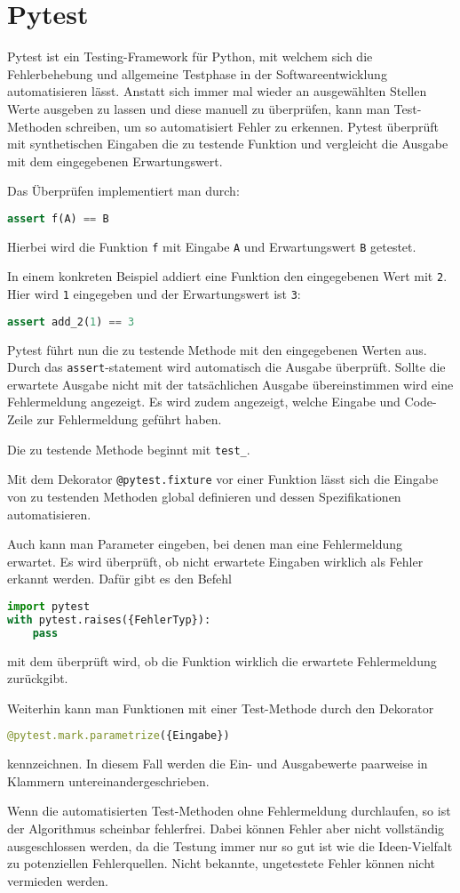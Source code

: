 \section{Pytest}
Pytest ist ein Testing-Framework für Python, mit welchem sich die Fehlerbehebung und allgemeine Testphase in der Softwareentwicklung automatisieren lässt. Anstatt sich immer mal wieder an ausgewählten Stellen Werte ausgeben zu lassen und diese manuell zu überprüfen, kann man Test-Methoden schreiben, um so automatisiert Fehler zu erkennen. Pytest überprüft mit synthetischen Eingaben die zu testende Funktion und vergleicht die Ausgabe mit dem eingegebenen Erwartungswert.

Das Überprüfen implementiert man durch:
\begin{lstlisting}[language=python]
assert f(A) == B
\end{lstlisting}
Hierbei wird die Funktion \texttt{f} mit Eingabe \texttt{A} und Erwartungswert \texttt{B} getestet.

In einem konkreten Beispiel addiert eine Funktion den eingegebenen Wert mit \texttt{2}. Hier wird \texttt{1} eingegeben und der Erwartungswert ist \texttt{3}:
\begin{lstlisting}[language=python]
assert add_2(1) == 3
\end{lstlisting}

Pytest führt nun die zu testende Methode mit den eingegebenen Werten aus. Durch das \texttt{assert}-statement wird automatisch die Ausgabe überprüft. Sollte die erwartete Ausgabe nicht mit der tatsächlichen Ausgabe übereinstimmen wird eine Fehlermeldung angezeigt. Es wird zudem angezeigt, welche Eingabe und Code-Zeile zur Fehlermeldung geführt haben.

Die zu testende Methode beginnt mit \texttt{test\_}.

Mit dem Dekorator \texttt{@pytest.fixture} vor einer Funktion lässt sich die Eingabe von zu testenden Methoden global definieren und dessen Spezifikationen automatisieren.

Auch kann man Parameter eingeben, bei denen man eine Fehlermeldung erwartet. Es wird überprüft, ob nicht erwartete Eingaben wirklich als Fehler erkannt werden. Dafür gibt es den Befehl
\begin{lstlisting}[language=python]
import pytest
with pytest.raises({FehlerTyp}):
    pass
\end{lstlisting}
mit dem überprüft wird, ob die Funktion wirklich die erwartete Fehlermeldung zurückgibt.

Weiterhin kann man Funktionen mit einer Test-Methode durch den Dekorator
\begin{lstlisting}[language=python]
@pytest.mark.parametrize({Eingabe})
\end{lstlisting}
kennzeichnen. In diesem Fall werden die Ein- und Ausgabewerte paarweise in Klammern untereinandergeschrieben.

Wenn die automatisierten Test-Methoden ohne Fehlermeldung durchlaufen, so ist der Algorithmus scheinbar fehlerfrei. Dabei können Fehler aber nicht vollständig ausgeschlossen werden, da die Testung immer nur so gut ist wie die Ideen-Vielfalt zu potenziellen Fehlerquellen. Nicht bekannte, ungetestete Fehler können nicht vermieden werden.

